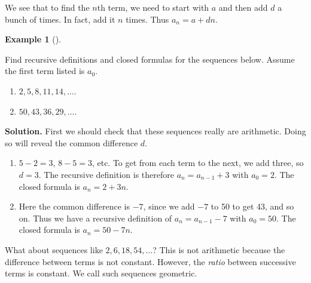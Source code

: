 \documentclass[10pt,]{book}
\theoremstyle{plain}
\theoremstyle{definition}
\newtheorem{example}[theorem]{Example}
\theoremstyle{definition}
\theoremstyle{definition}
\numberwithin{equation}{chapter}
\begin{document}
      We see that to find the \(n\)th term, we need to start with \(a\) and then add \(d\) a bunch of times. In fact, add it \(n\) times. Thus \(a_n = a+dn\).
\begin{example}[]\label{example-61}

          Find recursive definitions and closed formulas for the sequences below. Assume the first term listed is \(a_0\).
\leavevmode%
\begin{enumerate}
\item\hypertarget{li-872}{}\(2, 5, 8, 11, 14, \ldots\).%
\item\hypertarget{li-873}{}\(50, 43, 36, 29, \ldots\).%
\end{enumerate}
\par\medskip\noindent%
\textbf{Solution.}\quad
          First we should check that these sequences really are arithmetic. Doing so will reveal the common difference \(d\).
\leavevmode%
\begin{enumerate}
\item\hypertarget{li-874}{}\(5-2 = 3\), \(8-5 = 3\), etc. To get from each term to the next, we add three, so \(d = 3\). The recursive definition is therefore \(a_n = a_{n-1} + 3\) with \(a_0 = 2\). The closed formula is \(a_n = 2 + 3n\).%
\item\hypertarget{li-875}{}
              Here the common difference is \(-7\), since we add \(-7\) to 50 to get 43, and so on. Thus we have a recursive definition of \(a_n = a_{n-1} - 7\) with \(a_0 = 50\). The closed formula is \(a_n = 50 - 7n\).
\end{enumerate}
\end{example}
\par

      What about sequences like \(2, 6, 18, 54, \ldots\)? This is not arithmetic because the difference between terms is not constant. However, the \emph{ratio} between successive terms is constant. We call such sequences geometric.
\par
\end{document}
